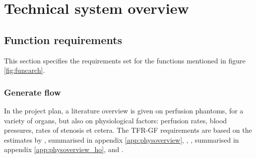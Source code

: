 \chapter{Technical system overview}

\section{Function requirements}
This section specifies the requirements set for the functions mentioned in figure \ref{fig:funcarch}.
\subsection{Generate flow}
In the project plan, a literature overview is given on perfusion phantoms, for a variety of organs, but also on physiological factors: perfusion rates, blood pressures, rates of stenosis et cetera. The TFR-GF requirements are based on the estimates by \cite{uren1994relation}, summarised in appendix \ref{app:physoverview}, \cite{chiribiri2013normal}, \cite{ho2014dynamic}, summarised in appendix \ref{app:physoverview_ho}, and \cite{slart2015pres}.


